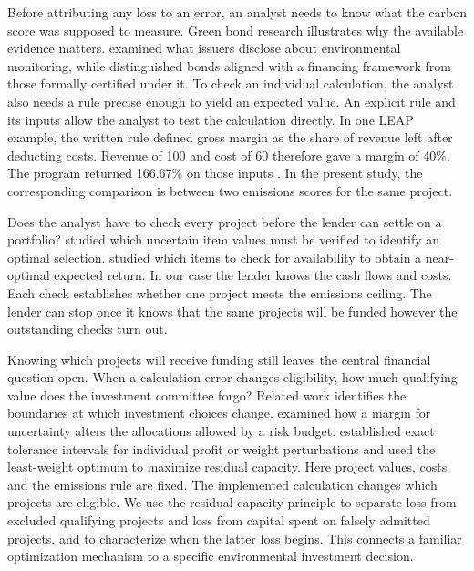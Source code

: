 Before attributing any loss to an error, an analyst needs to know what the carbon score was supposed to measure. Green bond research illustrates why the available evidence matters. \citet{nicolici} examined what issuers disclose about environmental monitoring, while \citet{loiola} distinguished bonds aligned with a financing framework from those formally certified under it. To check an individual calculation, the analyst also needs a rule precise enough to yield an expected value. An explicit rule and its inputs allow the analyst to test the calculation directly. In one LEAP example, the written rule defined gross margin as the share of revenue left after deducting costs. Revenue of 100 and cost of 60 therefore gave a margin of 40\%. The program returned 166.67\% on those inputs \citep{review}. In the present study, the corresponding comparison is between two emissions scores for the same project.

Does the analyst have to check every project before the lender can settle on a portfolio? \citet{schloter} studied which uncertain item values must be verified to identify an optimal selection. \citet{dughmi} studied which items to check for availability to obtain a near-optimal expected return. In our case the lender knows the cash flows and costs. Each check establishes whether one project meets the emissions ceiling. The lender can stop once it knows that the same projects will be funded however the outstanding checks turn out.

Knowing which projects will receive funding still leaves the central financial question open. When a calculation error changes eligibility, how much qualifying value does the investment committee forgo? Related work identifies the boundaries at which investment choices change. \citet{hien} examined how a margin for uncertainty alters the allocations allowed by a risk budget. \citet{pisinger} established exact tolerance intervals for individual profit or weight perturbations and used the least-weight optimum to maximize residual capacity. Here project values, costs and the emissions rule are fixed. The implemented calculation changes which projects are eligible. We use the residual-capacity principle to separate loss from excluded qualifying projects and loss from capital spent on falsely admitted projects, and to characterize when the latter loss begins. This connects a familiar optimization mechanism to a specific environmental investment decision.

